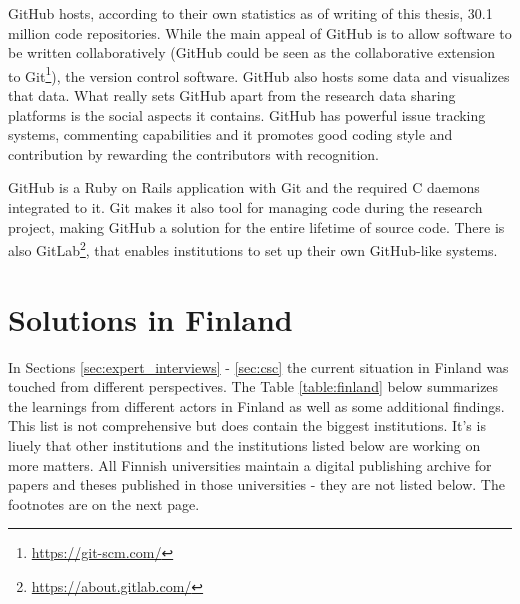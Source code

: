 GitHub hosts, according to their own statistics as of writing of this thesis,
30.1 million code repositories. While the main appeal of GitHub is to allow
software to be written collaboratively (GitHub could be seen as the
collaborative extension to Git\footnote{\url{https://git-scm.com/}}), the
version control software. GitHub also hosts some data and visualizes that data.
What really sets GitHub apart from the research data sharing platforms is the
social aspects it contains. GitHub has powerful issue tracking systems,
commenting capabilities and it promotes good coding style and contribution
by rewarding the contributors with recognition.

GitHub is a Ruby on Rails application with Git and the required C daemons
integrated to it. Git makes it also tool for managing code during the research
project, making GitHub a solution for the entire lifetime of source code. There
is also GitLab\footnote{\url{https://about.gitlab.com/}}, that enables
institutions to set up their own GitHub-like systems.

\clearpage

\section{Solutions in Finland}
\label{sec:finland_current}

In Sections \ref{sec:expert_interviews} - \ref{sec:csc} the current situation
in Finland was touched from different perspectives. The Table \ref{table:finland} below summarizes
the learnings from different actors in Finland as well as some additional
findings. This list is not comprehensive but does contain the biggest
institutions. It's is liuely that other institutions and the institutions listed
below are working on more matters. All Finnish universities maintain a digital
publishing archive for papers and theses published in those universities - they
are not listed below. The footnotes are on the next page.

